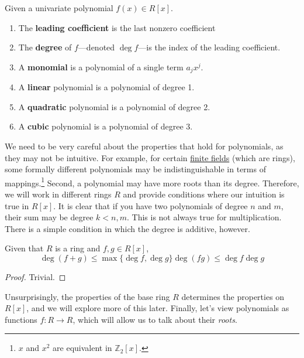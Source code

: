   \begin{definition}
    \label{def:some-terms-for-polynomials}
    Given a univariate polynomial $f(x) \in R[x]$. 
    \begin{enumerate} 
      \item The \textbf{leading coefficient} is the last nonzero coefficient  
      \item The \textbf{degree} of $f$---denoted $\deg f$---is the index of the leading coefficient.
      \item A \textbf{monomial} is a polynomial of a single term $a_j x^j$. 
      \item A \textbf{linear} polynomial is a polynomial of degree 1. 
      \item A \textbf{quadratic} polynomial is a polynomial of degree 2. 
      \item A \textbf{cubic} polynomial is a polynomial of degree 3. 
    \end{enumerate}
  \end{definition}

  We need to be very careful about the properties that hold for polynomials, as they may not be intuitive. For example, for certain \hyperref[thm:finite-fields]{finite fields} (which are rings), some formally different polynomials may be indistinguishable in terms of mappings.\footnote{$x$ and $x^2$ are equivalent in  $\mathbb{Z}_2 [x]$. } Second, a polynomial may have more roots than its degree. Therefore, we will work in different rings $R$ and provide conditions where our intuition is true in $R[x]$. It is clear that if you have two polynomials of degree $n$ and $m$, their sum may be degree $k < n, m$. This is not always true for multiplication. There is a simple condition in which the degree is additive, however. 

  \begin{lemma}
    \label{thm:bounds-on-degrees-from-operations}
    Given that $R$ is a ring and $f, g \in R[x]$, 
    \begin{equation}
      \deg(f+g) \leq \max\{\deg f, \deg g\}
      \deg(fg) \leq \deg f \deg g
    \end{equation}
  \end{lemma}
  \begin{proof}
    Trivial. 
  \end{proof}

  Unsurprisingly, the properties of the base ring $R$ determines the properties on $R[x]$, and we will explore more of this later. Finally, let's view polynomials as functions $f: R \to R$, which will allow us to talk about their \textit{roots}. 

